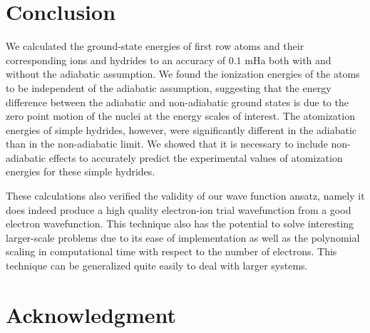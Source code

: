 \documentclass[pra,superscriptaddress,groupedaddress,twocolumn]{revtex4}
\begin{document}


\section{Conclusion}
We calculated the ground-state energies of first row atoms and their corresponding ions and hydrides to an accuracy of $0.1$ mHa both with and without the adiabatic assumption. We found the ionization energies of the atoms to be independent of the adiabatic assumption, suggesting that the energy difference between the adiabatic and non-adiabatic ground states is due to the zero point motion of the nuclei at the energy scales of interest. The atomization energies of simple hydrides, however, were significantly different in the adiabatic than in the non-adiabatic limit.   We showed that it is necessary to include non-adiabatic effects to accurately predict the experimental values of atomization energies for these simple hydrides.

These calculations also verified the validity of our wave function ansatz, namely it does indeed produce a high quality electron-ion trial wavefunction from a good electron wavefunction. This technique also has the potential to solve interesting larger-scale problems due to its ease of implementation as well as the polynomial scaling in computational time with respect to the number of electrons.  This technique can be generalized quite easily to deal with larger systems.

\section{Acknowledgment}



\end{document}
